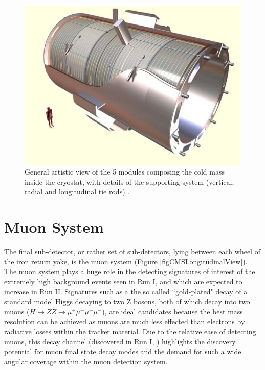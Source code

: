 \begin{figure} 
\begin{center}
\includegraphics[scale=0.5]{Figures/SuperconductingSolenoid.png}
\end{center}
\caption{ General artistic view of the 5 modules composing the cold mass inside the cryostat, with details of the supporting system (vertical, radial and longitudinal tie rods) \cite{CMSexperiment}.}
\label{fig-SuperconductingSolenoid}
\end{figure}


\section{Muon System} \label{sec-MuonSystem}

The final sub-detector, or rather set of sub-detectors, lying between each wheel of the iron return yoke, is the muon system (Figure \ref{figCMSLongitudinalView}). The muon system plays a huge role in the detecting signatures of interest of the extremely high background events seen in Run I, and which are expected to increase in Run II. Signatures such as a the so called ``gold-plated" decay of a standard model Higgs decaying to two Z bosons, both of which decay into two muons ($H \to ZZ \to \mu^+ \mu^- \mu^+ \mu^-$), are ideal candidates because the best mass resolution can be achieved as muons are much less effected than electrons by radiative losses within the tracker material. Due to the relative ease of detecting muons, this decay channel (discovered in Run I, \cite{}) highlights the discovery potential for muon final state decay modes and the demand for such a wide angular coverage within the muon detection system. 

